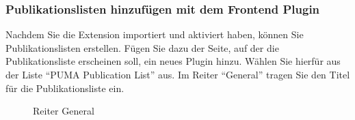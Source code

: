 \subsubsection*{Publikationslisten hinzufügen mit dem Frontend Plugin}\label{sss:typo3Publikationslisten}
Nachdem Sie die Extension importiert und aktiviert haben, können Sie Publikationslisten erstellen. Fügen Sie dazu der Seite, auf der die Publikationsliste erscheinen soll, ein neues Plugin hinzu. Wählen Sie hierfür aus der Liste \enquote{PUMA Publication List} aus.\newline
\newline
Im Reiter \enquote{General} tragen Sie den Titel für die Publikationsliste ein.
\begin{figure}[h!]
 \centering
 \caption{Reiter General}
 \label{fig:reiterGeneral}
\end{figure}

